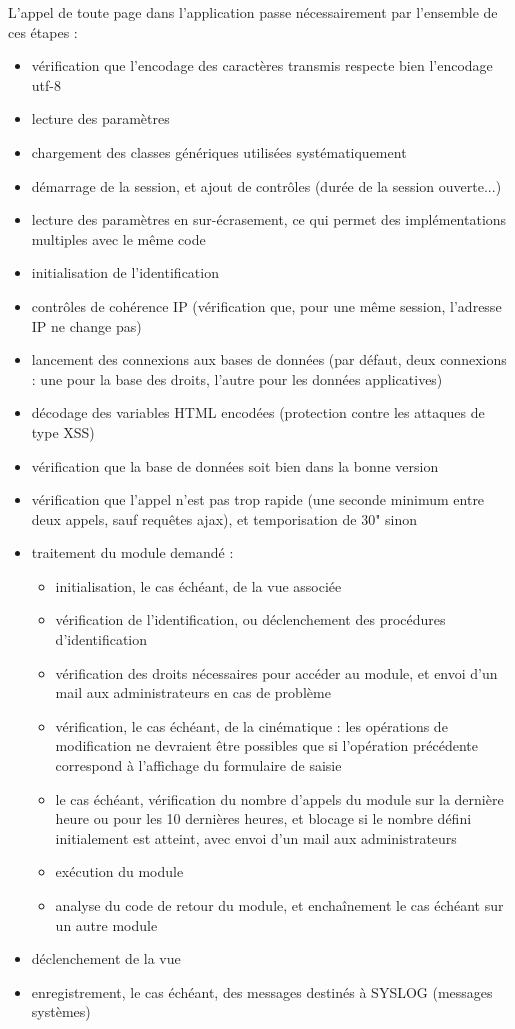 L'appel de toute page dans l'application passe nécessairement par l'ensemble de ces étapes :
\begin{itemize}
\item vérification que l'encodage des caractères transmis respecte bien l'encodage utf-8
\item lecture des paramètres
\item chargement des classes génériques utilisées systématiquement
\item démarrage de la session, et ajout de contrôles (durée de la session ouverte...)
\item lecture des paramètres en sur-écrasement, ce qui permet des implémentations multiples avec le même code
\item initialisation de l'identification
\item contrôles de cohérence IP (vérification que, pour une même session, l'adresse IP ne change pas)
\item lancement des connexions aux bases de données (par défaut, deux connexions : une pour la base des droits, l'autre pour les données applicatives)
\item décodage des variables HTML encodées (protection contre les attaques de type XSS)
\item vérification que la base de données soit bien dans la bonne version
\item vérification que l'appel n'est pas trop rapide (une seconde minimum entre deux appels, sauf requêtes ajax), et temporisation de 30" sinon
\item traitement du module demandé :
\begin{itemize}
\item initialisation, le cas échéant, de la vue associée 
\item vérification de l'identification, ou déclenchement des procédures d'identification
\item vérification des droits nécessaires pour accéder au module, et envoi d'un mail aux administrateurs en cas de problème
\item vérification, le cas échéant, de la cinématique : les opérations de modification ne devraient être possibles que si l'opération précédente correspond à l'affichage du formulaire de saisie
\item le cas échéant, vérification du nombre d'appels du module sur la dernière heure ou pour les 10 dernières heures, et blocage si le nombre défini initialement est atteint, avec envoi d'un mail aux administrateurs
\item exécution du module
\item analyse du code de retour du module, et enchaînement le cas échéant sur un autre module
\end{itemize}
\item déclenchement de la vue 
\item enregistrement, le cas échéant, des messages destinés à SYSLOG (messages systèmes)
\end{itemize}

